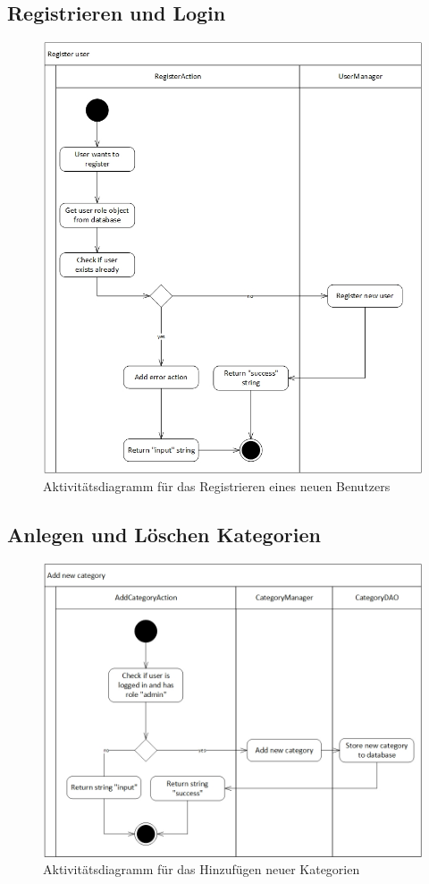 \documentclass[12pt,a4paper]{article}
\begin{document}
	\subsection{Registrieren und Login}
	\begin{figure}[H]
		\centering
		\includegraphics[scale=0.5]{diagrams/RegisterUser_activity.jpg}
		\caption{Aktivitätsdiagramm für das Registrieren eines neuen Benutzers}
	\end{figure}
	
	\subsection{Anlegen und Löschen Kategorien}
	\begin{figure}[H]
		\centering
		\includegraphics[scale=0.5]{diagrams/AddCategoryAction_activity.jpg}
		\caption{Aktivitätsdiagramm für das Hinzufügen neuer Kategorien}
	\end{figure}
\end{document}
